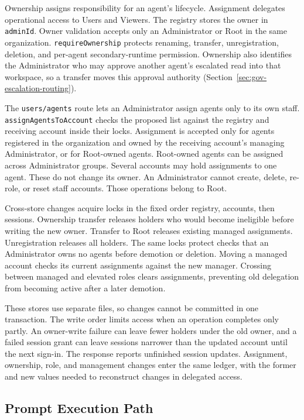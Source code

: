 {\color{red}Ownership assigns responsibility for an agent's lifecycle. Assignment
delegates operational access to Users and Viewers. The registry stores the
owner in \texttt{adminId}. Owner validation accepts only an Administrator or Root in
the same organization. \texttt{requireOwnership} protects renaming, transfer,
unregistration, deletion, and per-agent secondary-runtime permission. Ownership
also identifies the Administrator who may approve another agent's escalated
read into that workspace, so a transfer moves this approval authority
(Section~\ref{sec:gov-escalation-routing}).

The \texttt{users/agents} route lets an Administrator assign agents only to its
own staff. \texttt{assignAgentsToAccount} checks the proposed list against the
registry and receiving account inside their locks. Assignment is accepted only
for agents registered in the organization and owned by the receiving account's managing
Administrator, or for Root-owned agents. Root-owned agents can be assigned across
Administrator groups. Several accounts may hold assignments to one agent. These do not change its
owner. An Administrator cannot create, delete, re-role, or reset staff accounts.
Those operations belong to Root.

Cross-store changes acquire locks in the fixed order registry, accounts, then
sessions. Ownership transfer releases holders who would become ineligible
before writing the new owner. Transfer to Root releases existing managed
assignments. Unregistration releases all holders. The same locks protect checks
that an Administrator owns no agents before demotion or deletion. Moving a
managed account checks its current assignments against the new manager.
Crossing between managed and elevated roles clears assignments, preventing old
delegation from becoming active after a later demotion.

These stores use separate files, so changes cannot be committed in one transaction.
The write order limits access when an operation completes only partly. An owner-write failure can leave fewer
holders under the old owner, and a failed session grant can leave sessions
narrower than the updated account until the next sign-in. The response reports
unfinished session updates. Assignment, ownership, role, and management changes
enter the same ledger, with the former and new values needed to reconstruct
changes in delegated access.}

\FloatBarrier

\subsection{Prompt Execution Path}
\label{sec:gov-promptpath}

